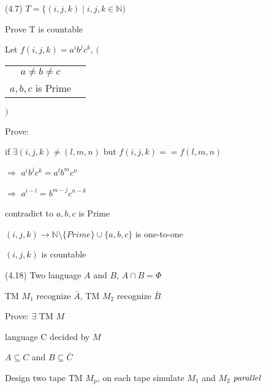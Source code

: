 \documentclass{article}
\begin{document}
\hspace{0.5cm}(4.7) $T = \{(i, j, k) \mid i, j, k \in \mathbb{N})$

\hspace{1.5cm} Prove T is countable

\vspace{5mm}

\hspace{0.5cm}Let $f(i, j, k) = a^ib^jc^k$, \hspace{0.25cm} $\Bigg($
\begin{tabular}{cc}
  $a \not= b \not= c$ \\
  $a, b, c$ is Prime
  \end{tabular} 
$\Bigg)$

\hspace{0.5cm}Prove:

\hspace{0.5cm}if $\exists (i, j, k) \not= (l, m, n)$ but $f(i, j, k) == f(l, m, n)$

\hspace{0.5cm}$\Rightarrow$ $a^ib^jc^k = a^lb^mc^n$

\hspace{0.5cm}$\Rightarrow$ $a^{i-l} = b^{m-j}c^{n-k}$

\hspace{0.5cm} contradict to $a, b, c$ is Prime

\hspace{0.5cm} $(i, j, k) \to \mathbb{N}\setminus\{Prime\}\cup\{a, b, c\}$ is one-to-one

\hspace{0.5cm} $(i, j, k)$ is countable

\vspace{5mm}

\hspace{0.5cm}(4.18) Two language $A$ and $B$, $A \cap B = \Phi$

\hspace{1.75cm} TM $M_1$ recognize $\bar{A}$, TM $M_2$ recognize $\bar{B}$

\hspace{1.75cm} Prove: $\exists$ TM $M$

\hspace{2cm}language C decided by $M$

\hspace{2cm} $A \subseteq C$ and $B \subseteq \bar{C}$

\vspace{5mm}

\hspace{0.5cm} Design two tape TM $M_p$, on each tape simulate $M_1$ and $M_2$ $\emph{parallel}$
 
\end{document}
